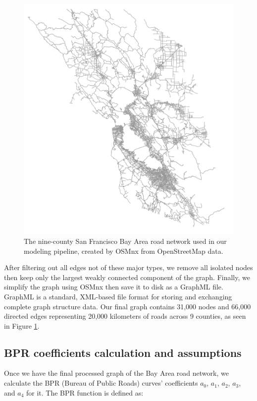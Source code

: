 \begin{figure}[htp]
\center
\includegraphics[width=5in]
{graphics/bay_area_network.png}
\caption{The nine-county San Francisco Bay Area road network used in our modeling pipeline, created by OSMnx from OpenStreetMap data.}
\label{fig:bay_area_road_network}
\end{figure}

After filtering out all edges not of these major types, we remove all isolated nodes then keep only the largest weakly connected component of the graph. Finally, we simplify the graph using OSMnx then save it to disk as a GraphML file. GraphML is a standard, XML-based file format for storing and exchanging complete graph structure data. Our final graph contains 31,000 nodes and 66,000 directed edges representing 20,000 kilometers of roads across 9 counties, as seen in Figure \ref{fig:bay_area_road_network}.

\subsection{BPR coefficients calculation and assumptions}

Once we have the final processed graph of the Bay Area road network, we calculate the BPR (Bureau of Public Roads) curves' coefficients $a_0$, $a_1$, $a_2$, $a_3$, and $a_4$ for it. The BPR function is defined as:


